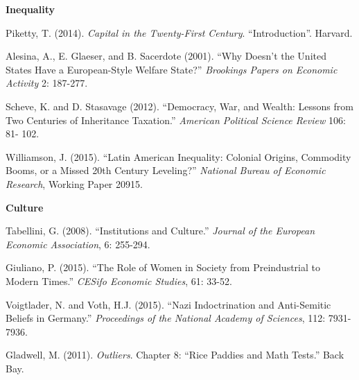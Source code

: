 \documentclass[letterpaper]{article}
\renewenvironment{itemize}{
  \begin{list}{}{
    \setlength{\leftmargin}{1.5em}
  }
}{
  \end{list}
}
\begin{document}
\begin{enumerate}
\item {\bf Inequality}
	\begin{itemize}
		\item[$\bullet$] Piketty, T. (2014). \emph{Capital in the Twenty-First Century}. ``Introduction''. Harvard.
		\item[$\bullet$] Alesina, A., E. Glaeser, and B. Sacerdote (2001). ``Why Doesn't the United States Have a European-Style Welfare State?'' \emph{Brookings Papers on Economic Activity} 2: 187-277. 
		\item[$\bullet$] Scheve, K. and D. Stasavage (2012). ``Democracy, War, and Wealth: Lessons from Two Centuries of Inheritance Taxation.'' \emph{American Political Science Review} 106: 81- 102. 
		\item[$\bullet$] Williamson, J. (2015). ``Latin American Inequality: Colonial Origins, Commodity Booms, or a Missed 20th Century Leveling?'' \emph{National Bureau of Economic Research}, Working Paper 20915.
	\end{itemize}


\item {\bf Culture}
	\begin{itemize}
		\item[$\bullet$] Tabellini, G. (2008). ``Institutions and Culture.'' \emph{Journal of the European Economic
		Association}, 6: 255-294.
		\item[$\bullet$] Giuliano, P. (2015). ``The Role of Women in Society from Preindustrial to Modern
		Times.'' \emph{CESifo Economic Studies}, 61: 33-52.
		\item[$\bullet$] Voigtlader, N. and Voth, H.J. (2015). ``Nazi Indoctrination and Anti-Semitic Beliefs in Germany.'' \emph{Proceedings of the National Academy of Sciences}, 112: 7931-7936.
		\item[$\bullet$] Gladwell, M. (2011). \emph{Outliers}. Chapter 8: ``Rice Paddies and Math Tests.'' Back Bay.
	\end{itemize}



\end{enumerate}




  


  










%
%
\end{document}
